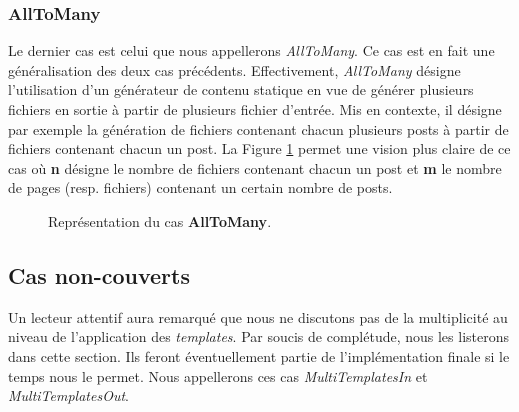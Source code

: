 		\subsubsection*{AllToMany}
			
			Le dernier cas est celui que nous appellerons \textit{AllToMany}. Ce cas est en fait une généralisation des deux cas précédents. Effectivement, \textit{AllToMany} désigne l'utilisation d'un générateur de contenu statique en vue de générer plusieurs fichiers en sortie à partir de plusieurs fichier d'entrée. Mis en contexte, il désigne par exemple la génération de fichiers contenant chacun plusieurs posts à partir de fichiers contenant chacun un post. La Figure \ref{fig:AllToMany} permet une vision plus claire de ce cas où \textbf{n} désigne le nombre de fichiers contenant chacun un post et \textbf{m} le nombre de pages (resp. fichiers) contenant un certain nombre de posts.\\
			
			\begin{figure}
				\begin{center}
					\caption{Représentation du cas \textbf{AllToMany}.}
					\label{fig:AllToMany}
				\end{center}
			\end{figure}
		
		\subsection{Cas non-couverts}
			Un lecteur attentif aura remarqué que nous ne discutons pas de la multiplicité au niveau de l'application des \textit{templates}. Par soucis de complétude, nous les listerons dans cette section. Ils feront éventuellement partie de l'implémentation finale si le temps nous le permet. Nous appellerons ces cas \textit{MultiTemplatesIn} et \textit{MultiTemplatesOut}.
			
